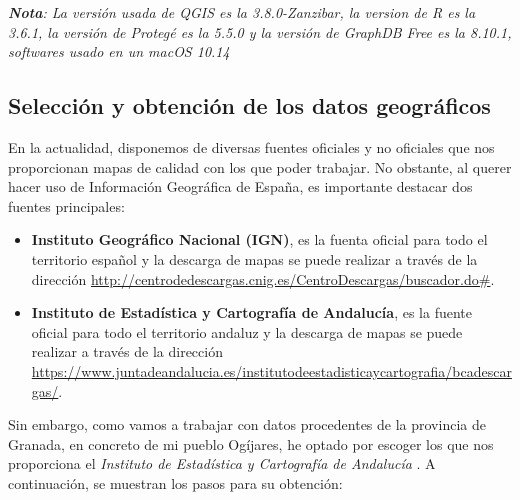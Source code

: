 
\textit{\textbf{Nota}: La versión usada de QGIS es la 3.8.0-Zanzibar, la version de R es la 3.6.1, la versión de Protegé es la 5.5.0 y la versión de GraphDB Free es la 8.10.1, softwares usado en un macOS 10.14}

\subsection{Selección y obtención de los datos geográficos}

En la actualidad, disponemos de diversas fuentes oficiales y no oficiales que nos proporcionan mapas de calidad con los que poder trabajar. No obstante, al querer hacer uso de Información Geográfica de España, es importante destacar dos fuentes principales:

\begin{itemize}
	\item \textbf{Instituto Geográfico Nacional (IGN)}, es la fuenta oficial para todo el territorio español y la descarga de mapas se puede realizar a través de la dirección \url{http://centrodedescargas.cnig.es/CentroDescargas/buscador.do#}.
	
	\item \textbf{Instituto de Estadística y Cartografía de Andalucía}, es la fuente oficial para todo el territorio andaluz y la descarga de mapas se puede realizar a través de la dirección \url{https://www.juntadeandalucia.es/institutodeestadisticaycartografia/bcadescargas/}.
\end{itemize}
 
Sin embargo, como vamos a trabajar con datos procedentes de la provincia de Granada, en concreto de mi pueblo Ogíjares, he optado por escoger los que nos proporciona el \textit{Instituto de Estadística y Cartografía de Andalucía} \cite{base-andalucia}. A continuación, se muestran los pasos para su obtención:


